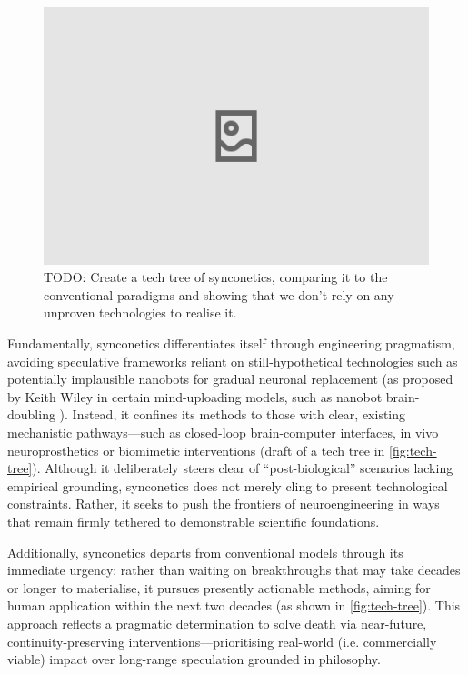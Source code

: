 \documentclass[10pt]{article}
\begin{document}
\begin{sloppypar}
  \begin{figure}[ht!]
    \centering
    \includegraphics[width=\textwidth]{figures/tech-tree.png}
    \caption{TODO: Create a tech tree of synconetics, comparing it to the conventional paradigms and showing that we don’t rely on any unproven technologies to realise it.}
    \label{fig:tech-tree}
  \end{figure}

  Fundamentally, synconetics differentiates itself through engineering pragmatism, avoiding speculative frameworks reliant on still-hypothetical technologies such as potentially implausible nanobots for gradual neuronal replacement (as proposed by Keith Wiley in certain mind-uploading models, such as nanobot brain-doubling \citep{wiley_taxonomy_2014}). Instead, it confines its methods to those with clear, existing mechanistic pathways—such as closed-loop brain-computer interfaces, in vivo neuroprosthetics or biomimetic interventions (draft of a tech tree in \autoref{fig:tech-tree}). Although it deliberately steers clear of “post-biological” scenarios lacking empirical grounding, synconetics does not merely cling to present technological constraints. Rather, it seeks to push the frontiers of neuroengineering in ways that remain firmly tethered to demonstrable scientific foundations.

  Additionally, synconetics departs from conventional models through its immediate urgency: rather than waiting on breakthroughs that may take decades or longer to materialise, it pursues presently actionable methods, aiming for human application within the next two decades (as shown in \autoref{fig:tech-tree}). This approach reflects a pragmatic determination to solve death via near-future, continuity-preserving interventions—prioritising real-world (i.e. commercially viable) impact over long-range speculation grounded in philosophy.


\end{sloppypar}
\end{document}
